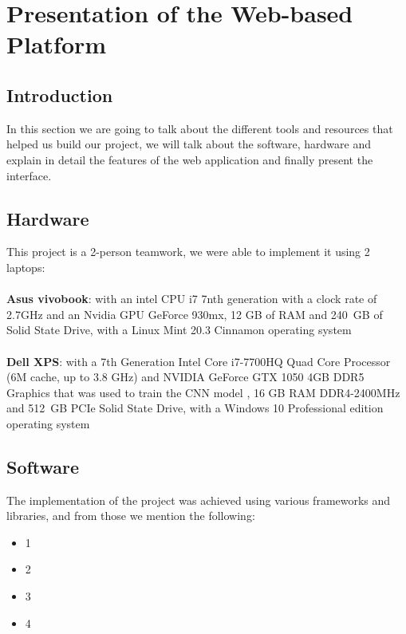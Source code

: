 \section{Presentation of the Web-based Platform}



\subsection{Introduction}
    In this section we are going to talk about the different tools and resources that helped us build our project, we will talk about the software, hardware and explain in detail the features of the web application and finally present the interface.


\subsection{Hardware}
    This project is a 2-person teamwork, we were able to implement it using 2 laptops: \\
    \bigskip \\
    \textbf{Asus vivobook}: with an intel CPU i7 7nth generation with a clock rate of 2.7GHz and an Nvidia GPU GeForce 930mx, 12 GB of RAM and 240 GB of Solid State Drive, with a Linux Mint 20.3 Cinnamon operating system\\ 
    \bigskip \\
    \textbf{Dell XPS}: with a 7th Generation Intel Core i7-7700HQ Quad Core Processor (6M cache, up to 3.8 GHz) and NVIDIA GeForce GTX 1050 4GB DDR5 Graphics that was used to train the CNN model , 16 GB RAM DDR4-2400MHz and 512 GB PCIe Solid State Drive, with a Windows 10 Professional edition operating system \\ 


\subsection{Software}
    The implementation of the project was achieved using various frameworks and libraries, and from those we mention the following: \\
    \begin{itemize}
        \item 1
        \item 2
        \item 3
        \item 4
    \end{itemize}

